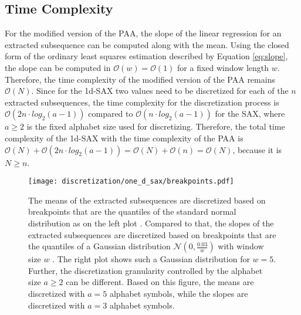 \subsection*{Time Complexity}
For the modified version of the \ac{PAA}, the slope of the linear regression for an extracted subsequence can be computed along with the mean. Using the closed form of the ordinary least squares estimation described by Equation \ref{eq:slope}, the slope can be computed in $\mathcal{O}(w) = \mathcal{O}(1)$ for a fixed window length $w$. Therefore, the time complexity of the modified version of the \ac{PAA} remains $\mathcal{O}(N)$. \newline
Since for the \ac{1d-SAX} two values need to be discretized for each of the $n$ extracted subsequences, the time complexity for the discretization process is $\mathcal{O}(2n \cdot log_{2}(a-1))$ compared to $\mathcal{O}(n \cdot log_{2}(a-1))$ for the \ac{SAX}, where $a \geq 2$ is the fixed alphabet size used for discretizing. \newline
Therefore, the total time complexity of the \ac{1d-SAX} with the time complexity of the \ac{PAA} is $\mathcal{O}(N) + \mathcal{O}(2n \cdot log_{2}(a-1)) = \mathcal{O}(N) + \mathcal{O}(n) = \mathcal{O}(N)$, because it is $N \geq n$.
\begin{figure}[htb]
\centering
\texttt{[image: discretization/one\_d\_sax/breakpoints.pdf]}
\caption[1d-Symbolic Aggregate Approximation - Breakpoints]{The means of the extracted subsequences are discretized based on breakpoints that are the quantiles of the standard normal distribution as on the left plot \cite{1d-SAX}. Compared to that, the slopes of the extracted subsequences are discretized based on breakpoints that are the quantiles of a Gaussian distribution $\mathcal{N}(0,\frac{0.03}{w})$ with window size $w$ \cite{1d-SAX}. The right plot shows such a Gaussian distribution for $w = 5$. Further, the discretization granularity controlled by the alphabet size $a \geq 2$ can be different. Based on this figure, the means are discretized with $a = 5$ alphabet symbols, while the slopes are discretized with $a = 3$ alphabet symbols.}
\label{fig:1d-SAX_Breakpoints}
\end{figure}
